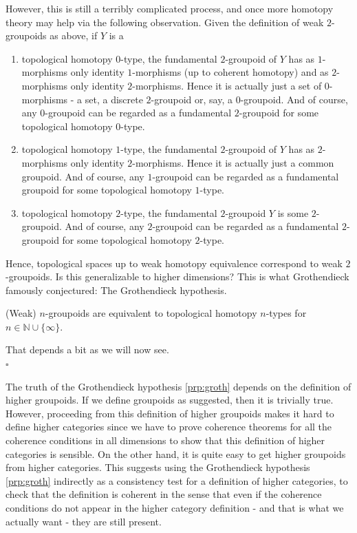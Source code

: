 However, this is still a terribly complicated process, and once more homotopy theory may help via the following observation.
Given the definition of weak $2$-groupoids as above, if $Y$ is a
\begin{enumerate}
\item[(0)]
topological homotopy $0$-type, the fundamental $2$-groupoid of $Y$ has as $1$-morphisms only identity $1$-morphisms (up to coherent homotopy) and as $2$-morphisms only identity $2$-morphisms.
Hence it is actually just a set of $0$-morphisms - a set, a discrete $2$-groupoid or, say, a $0$-groupoid.
And of course, any $0$-groupoid can be regarded as a fundamental $2$-groupoid for some topological homotopy $0$-type.
\item[(1)]
topological homotopy $1$-type, the fundamental $2$-groupoid of $Y$ has as $2$-morphisms only identity $2$-morphisms.
Hence it is actually just a common groupoid.
And of course, any $1$-groupoid can be regarded as a fundamental groupoid for some topological homotopy $1$-type.
\item[(2)]
topological homotopy $2$-type, the fundamental $2$-groupoid $Y$ is some $2$-groupoid.
And of course, any $2$-groupoid can be regarded as a fundamental $2$-groupoid for some topological homotopy $2$-type.
\end{enumerate}
Hence, topological spaces up to weak homotopy equivalence correspond to weak $2$-groupoids.
Is this generalizable to higher dimensions?
This is what Grothendieck famously conjectured: The Grothendieck hypothesis.
\\
\begin{prp}[Grothendieck]
\label{prp:groth}
(Weak) $n$-groupoids are equivalent to topological homotopy $n$-types for $n \in \mathbb{N} \cup \lbrace \infty \rbrace$.
\end{prp}
\begin{prf}
That depends a bit as we will now see.
\\
\phantom{proven}
\hfill
$\square$
\end{prf}
The truth of the Grothendieck hypothesis \ref{prp:groth} depends on the definition of higher groupoids.
If we define groupoids as suggested, then it is trivially true.
However, proceeding from this definition of higher groupoids makes it hard to define higher categories since we have to prove coherence theorems for all the coherence conditions in all dimensions to show that this definition of higher categories is sensible.
On the other hand, it is quite easy to get higher groupoids from higher categories.
This suggests using the Grothendieck hypothesis \ref{prp:groth} indirectly as a consistency test for a definition of higher categories, to check that the definition is coherent in the sense that even if the coherence conditions do not appear in the higher category definition - and that is what we actually want - they are still present.
